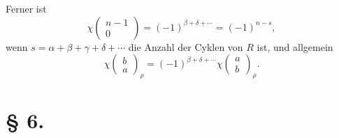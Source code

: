 \documentclass[11pt]{article}
\begin{document}
Ferner ist
\begin{equation}\tag{4.}
 \chi\left(\begin{matrix}n-1\\0\end{matrix}\right)=(-1)^{\beta+
\delta+\cdots}=(-1)^{n-s},
\end{equation}
wenn $s=\alpha+
\beta+
\gamma+
\delta+
\cdots$ die Anzahl der Cyklen von $R$ ist, und allgemein
\[
 \chi\left(\begin{matrix}b\\a\end{matrix}\right)_\rho=(-1)^{\beta+
\delta+
\cdots}\chi\left(\begin{matrix}a\\b\end{matrix}\right)_\rho.
\]

\section*{§ 6.}
\end{document}
